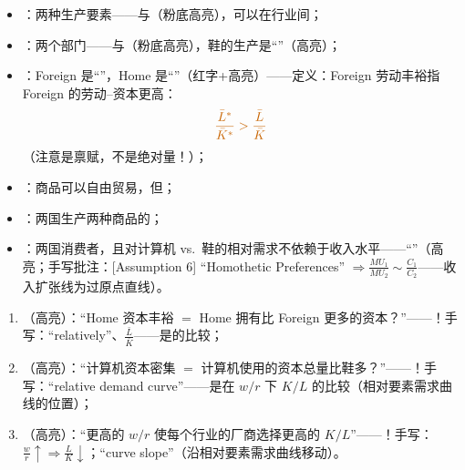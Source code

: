 \begin{assumpbox}
\begin{itemize}
  \item {}：两种生产要素——与（粉底高亮），可以在行业间；
  \item {}：两个部门——与（粉底高亮），鞋的生产是``''（高亮）；
  \item {}：Foreign 是``''，Home 是``''（红字+高亮）——定义：Foreign 劳动丰裕指 Foreign 的劳动--资本更高：
  \[
  {\color{hlorange}\frac{\bar{L}^*}{\bar{K}^*} > \frac{\bar{L}}{\bar{K}}}
  \]
  （注意是禀赋，不是绝对量！）；
  \item {}：商品可以自由贸易，但；
  \item {}：两国生产两种商品的；
  \item {}：两国消费者，且对计算机 vs.\ 鞋的相对需求不依赖于收入水平——``''（高亮；手写批注：[Assumption 6] ``Homothetic Preferences'' $\Rightarrow \frac{MU_1}{MU_2} \sim \frac{C_1}{C_2}$——收入扩张线为过原点直线）。
\end{itemize}
\end{assumpbox}

\begin{defbox}
\begin{enumerate}
  \item {}（高亮）：``Home 资本丰裕 $=$ Home 拥有比 Foreign 更多的资本？''——！手写：``relatively''、$\frac{\bar{L}}{\bar{K}}$——是的比较；
  \item {}（高亮）：``计算机资本密集 $=$ 计算机使用的资本总量比鞋多？''——！手写：``relative demand curve''——是在 $w/r$ 下 $K/L$ 的比较（相对要素需求曲线的位置）；
  \item {}（高亮）：``更高的 $w/r$ 使每个行业的厂商选择更高的 $K/L$''——！手写：$\frac{w}{r} \uparrow \Rightarrow \frac{L}{K} \downarrow$；``curve slope''（沿相对要素需求曲线移动）。
\end{enumerate}
\end{defbox}


